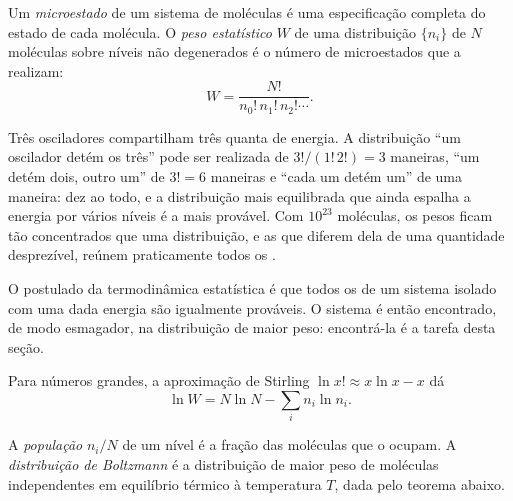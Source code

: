 \begin{definition}\label{def:b3:partition-functions:microstate}
Um \emph{microestado} de um sistema de moléculas é uma
especificação completa do estado de cada molécula. O \emph{peso
estatístico} $W$ de uma distribuição $\{n_i\}$ de $N$
moléculas sobre níveis não degenerados é o número de microestados que a realizam:
\[
  W = \frac{N!}{n_0!\,n_1!\,n_2!\cdots}.
\]
\end{definition}

\begin{example}\label{ex:b3:partition-functions:three-quanta}
Três osciladores compartilham três quanta de energia. A distribuição ``um
oscilador detém os três'' pode ser realizada de $3!/(1!\,2!) = 3$ maneiras, ``um
detém dois, outro um'' de $3! = 6$ maneiras e ``cada um detém um'' de uma
maneira: dez  ao todo, e a distribuição mais equilibrada que ainda
espalha a energia por vários níveis é a mais provável. Com $10^{23}$ moléculas,
os pesos ficam tão concentrados que uma distribuição, e as que diferem dela de
uma quantidade desprezível, reúnem praticamente todos os .
\end{example}

\begin{remark}
O postulado da termodinâmica estatística é que todos os  de um
sistema isolado com uma dada energia são igualmente prováveis. O sistema é então
encontrado, de modo esmagador, na distribuição de maior peso: encontrá-la é a
tarefa desta seção.
\end{remark}

Para números grandes, a aproximação de Stirling $\ln x! \approx x\ln x - x$ dá
\[
  \ln W = N\ln N - \sum_i n_i\ln n_i .
\]

\begin{definition}\label{def:b3:partition-functions:boltzmann}
A \emph{população} $n_i/N$ de um nível é a fração das
moléculas que o ocupam. A \emph{distribuição de Boltzmann}
é a distribuição de maior peso de moléculas independentes em
equilíbrio térmico à temperatura $T$, dada pelo teorema abaixo.
\end{definition}

